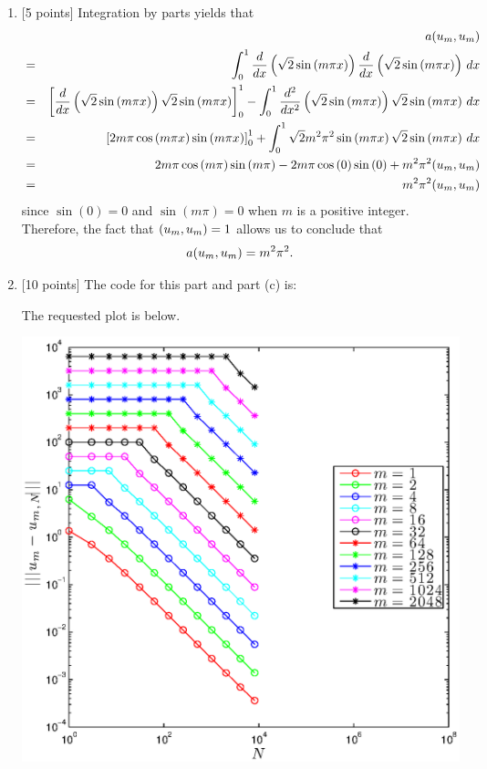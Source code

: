 \begin{solution}
\begin{enumerate}
\item {[5 points]} Integration by parts yields that
\begin{eqnarray*}
&&a(u_m,u_m)
\\
&=&\int_0^1{d \over dx}\left(\sqrt{2}\sin\left(m\pi x\right)\right){d \over dx}\left(\sqrt{2}\sin\left(m\pi x\right)\right)\,dx
\\
&=&\left[{d \over dx}\left(\sqrt{2}\sin\left(m\pi x\right)\right)\sqrt{2}\sin\left(m\pi x\right)\right]_0^1-\int_0^1{d^2 \over dx^2}\left(\sqrt{2}\sin\left(m\pi x\right)\right)\sqrt{2}\sin\left(m\pi x\right)\,dx
\\
&=&\left[2m\pi\cos\left(m\pi x\right)\sin\left(m\pi x\right)\right]_0^1+\int_0^1\sqrt{2}m^2\pi^2\sin\left(m\pi x\right)\sqrt{2}\sin\left(m\pi x\right)\,dx
\\
&=&2m\pi\cos\left(m\pi\right)\sin\left(m\pi\right)-2m\pi\cos\left(0\right)\sin\left(0\right)+m^2\pi^2(u_m,u_m)
\\
&=&m^2\pi^2(u_m,u_m)
\end{eqnarray*}
since $\sin\left(0\right)=0$ and $\sin\left(m\pi\right)=0$ when $m$ is a positive integer. Therefore, the fact that $(u_m,u_m)=1$ allows us to conclude that
\[
a(u_m,u_m)=m^2\pi^2.
\]

\vspace*{1em}
\item {[10 points]} The code for this part and part (c) is:



The requested plot is below.
\begin{center}
\includegraphics[scale=0.75]{hw33b.eps}
\end{center}


\end{enumerate}
\end{solution}
